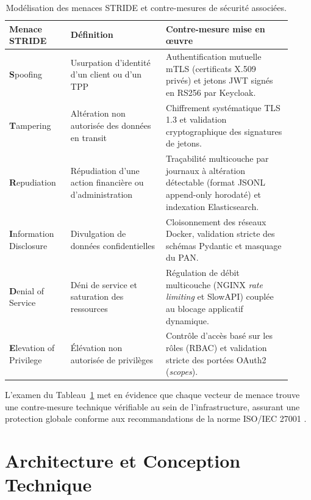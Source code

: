 \begin{table}[H]
    \centering
    \footnotesize
    \begin{tabular}{|>{\raggedright\arraybackslash}p{0.20\linewidth}|>{\raggedright\arraybackslash}p{0.31\linewidth}|>{\raggedright\arraybackslash}p{0.41\linewidth}|}
        \hline
        \textbf{Menace STRIDE} & \textbf{Définition} & \textbf{Contre-mesure mise en œuvre} \\ \hline
        \textbf{S}poofing & Usurpation d'identité d'un client ou d'un TPP & Authentification mutuelle mTLS (certificats X.509 privés) et jetons JWT signés en RS256 par Keycloak. \\ \hline
        \textbf{T}ampering & Altération non autorisée des données en transit & Chiffrement systématique TLS 1.3 et validation cryptographique des signatures de jetons. \\ \hline
        \textbf{R}epudiation & Répudiation d'une action financière ou d'administration & Traçabilité multicouche par journaux à altération détectable (format JSONL append-only horodaté) et indexation Elasticsearch. \\ \hline
        \textbf{I}nformation Disclosure & Divulgation de données confidentielles & Cloisonnement des réseaux Docker, validation stricte des schémas Pydantic et masquage du PAN. \\ \hline
        \textbf{D}enial of Service & Déni de service et saturation des ressources & Régulation de débit multicouche (NGINX \textit{rate limiting} et SlowAPI) couplée au blocage applicatif dynamique. \\ \hline
        \textbf{E}levation of Privilege & Élévation non autorisée de privilèges & Contrôle d'accès basé sur les rôles (RBAC) et validation stricte des portées OAuth2 (\textit{scopes}). \\ \hline
    \end{tabular}
    \caption{Modélisation des menaces STRIDE et contre-mesures de sécurité associées.}
    \label{tab:stride}
\end{table}

L'examen du Tableau~\ref{tab:stride} met en évidence que chaque vecteur de menace trouve une contre-mesure technique vérifiable au sein de l'infrastructure, assurant une protection globale conforme aux recommandations de la norme ISO/IEC 27001 \cite{iso27001}.

\clearpage
\section{Architecture et Conception Technique}

